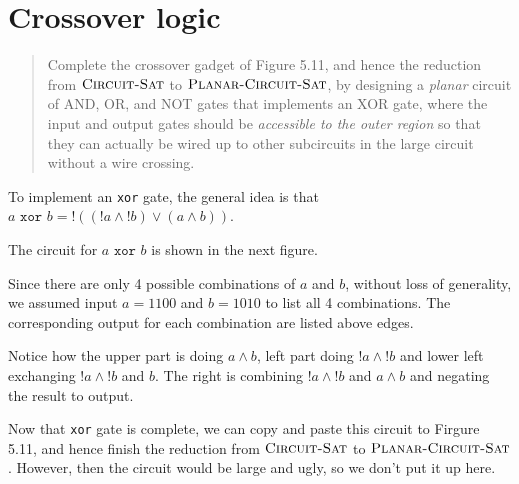 \section*{Crossover logic}
    \begin{quote}
    Complete the crossover gadget of Figure 5.11, and hence the reduction from
    $\textsc{Circuit-Sat}$ to $\textsc{Planar-Circuit-Sat}$,
    by designing a \emph{planar} circuit of AND, OR, and NOT gates that implements an XOR gate, 
    where
    the input and output gates should be \emph{accessible to the outer region} so that they can actually be wired up to other subcircuits in the large circuit without a wire crossing.
    \end{quote}

    To implement an \texttt{xor} gate, the general idea is that $a \texttt{ xor } b = !((!a \wedge !b) \vee (a \wedge b))$.
    
    The circuit for $a \texttt{ xor } b$ is shown in the next figure. 

    Since there are only 4 possible combinations of $a$ and $b$, without loss of generality, we assumed input $a = 1100$ and $b = 1010$ to list all 4 combinations. 
    The corresponding output for each combination are listed above edges.

    Notice how the upper part is doing $a \wedge b$, left part doing $!a \wedge !b$ and lower left exchanging $!a \wedge !b$ and $b$.
    The right is combining $!a \wedge !b$ and $a \wedge b$ and negating the result to output.

    Now that \texttt{xor} gate is complete, we can copy and paste this circuit to Firgure 5.11, and hence finish the reduction from
    $\textsc{Circuit-Sat}$ to $\textsc{Planar-Circuit-Sat}$.
    However, then the circuit would be large and ugly, so we don't put it up here.

